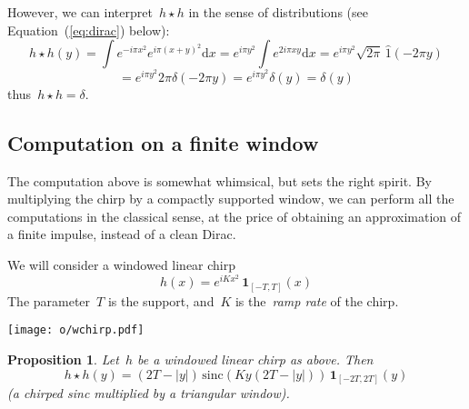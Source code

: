 \documentclass[a4paper]{article}           %
\newtheorem{proposition}[theorem]{Proposition}
\newcommand{\1}{\mathbf{1}}
\newcommand{\ud}{\mathrm{d}}
\newcommand{\abs}[1]{\left|#1\right|}
\newcommand{\paren}[1]{\left(#1\right)}
\begin{document}
However, we can interpret~$h\star h$ in the sense of distributions (see
Equation~(\ref{eq:dirac}) below):
$$
h\star h (y)
=
\int e^{-i\pi x^2}e^{i\pi(x+y)^2}\ud x
=
e^{i\pi y^2}
\int e^{2i\pi xy}
\ud x
=
e^{i\pi y^2}\sqrt{2\pi}\, \widehat{1}\paren{-2\pi y}
$$
$$
=
e^{i\pi y^2}2\pi\delta\paren{-2\pi y}
=
e^{i\pi y^2}\delta(y)
=\delta(y)
$$
thus~$h\star h=\delta$.


\subsection{Computation on a finite window}
The computation above is somewhat whimsical, but sets the right spirit.  By
multiplying the chirp by a compactly supported window, we can perform all the
computations in the classical sense,  at the price of obtaining an
approximation of a finite impulse, instead of a clean Dirac.

We will consider a windowed linear chirp
$$
h(x)
=
e^{iKx^2}
\,
\1_{[-T,T]}(x)
$$
The parameter~$T$ is the support, and~$K$ is the~\emph{ramp rate}
of the chirp.


\texttt{[image: o/wchirp.pdf]}


\clearpage
\begin{proposition}
	Let~$h$ be a windowed linear chirp as above.  Then
	\[
		h\star h(y)=
		\paren{2T-\abs{y}}
		\,
		\mathrm{sinc}\paren{ Ky\paren{2T-\abs{y}} }
		\,
		\1_{[-2T,2T]}(y)
	\]
	(a chirped sinc multiplied by a triangular window).
\end{proposition}
\end{document}
